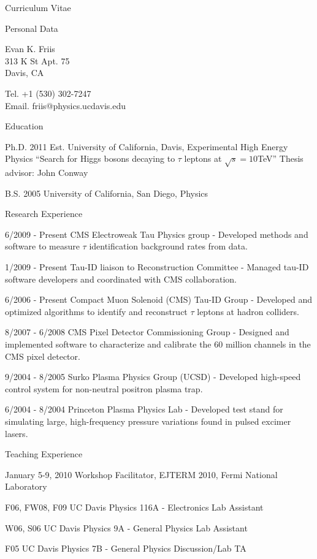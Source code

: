 \documentclass[12pt]{amsart}
\title{}
\author{}
\date{} %
\begin{document}
\nobibliography*
\begin{cv}{Curriculum Vitae}

\begin{cvlist}{Personal Data}
\item Evan K. Friis\\
313 K St Apt. 75\\
Davis, CA

\item Tel. +1 (530) 302-7247\\
Email. friis@physics.ucdavis.edu
\end{cvlist}

\begin{cvlist}{Education}
\item[Ph.D. 2011 Est.] University of California, Davis, Experimental High Energy Physics 
   ``Search for Higgs bosons decaying to $\tau$ leptons at $\sqrt s = 10$TeV'' Thesis advisor: John Conway
\item[B.S. 2005] University of California, San Diego, Physics
\end{cvlist}

\begin{cvlist}{Research Experience}
\item[6/2009 - Present] CMS Electroweak Tau Physics group - Developed methods and software to measure $\tau$ identification background rates from data.
\item[1/2009 - Present] Tau-ID liaison to Reconstruction Committee - Managed tau-ID software developers and coordinated with CMS collaboration.
\item[6/2006 - Present] Compact Muon Solenoid (CMS) Tau-ID Group - Developed and optimized algorithms to identify and reconstruct $\tau$ leptons at hadron colliders.
\item[8/2007 - 6/2008] CMS Pixel Detector Commissioning Group - Designed and implemented software to characterize and calibrate the 60 million channels in the CMS pixel detector.
\item[9/2004 - 8/2005] Surko Plasma Physics Group (UCSD) - Developed high-speed control system for non-neutral positron plasma trap.
\item[6/2004 - 8/2004] Princeton Plasma Physics Lab - Developed test stand for simulating large, high-frequency pressure variations found in pulsed excimer lasers.
\end{cvlist}

\begin{cvlist}{Teaching Experience}
\item[January 5-9, 2010] Workshop Facilitator, EJTERM 2010, Fermi National Laboratory
\item[F06, FW08, F09] UC Davis Physics 116A - Electronics Lab Assistant
\item[W06, S06] UC Davis Physics 9A - General Physics Lab Assistant
\item[F05] UC Davis Physics 7B - General Physics Discussion/Lab TA
\end{cvlist}


\end{cv}
\end{document}
